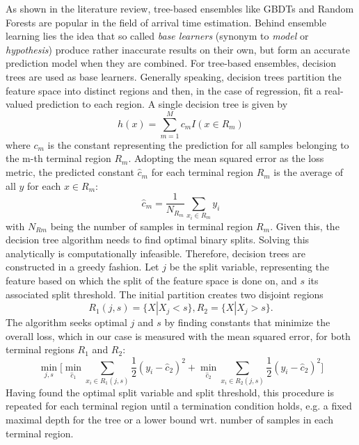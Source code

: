 As shown in the literature review, tree-based ensembles like GBDTs and Random Forests are popular in the field of arrival time estimation. Behind ensemble learning lies the idea that so called \textit{base learners} (synonym to \textit{model} or \textit{hypothesis}) produce rather inaccurate results on their own, but form an accurate prediction model when they are combined. For tree-based ensembles, decision trees are used as base learners. 
Generally speaking, decision trees partition the feature space into distinct regions and then, in the case of regression, fit a real-valued prediction to each region. 
A single decision tree is given by
\begin{equation}
h(x) = \sum_{m=1}^{M} c_m I(x \in R_m)
\end{equation}
where $ c_m $ is the constant representing the prediction for all samples belonging to the m-th terminal region $ R_m $. Adopting the mean squared error as the loss metric, the predicted constant $ \hat{c}_m $ for each terminal region $ R_m $ is the average of all $ y $ for each $ x \in R_m $:
\begin{equation}
	\hat{c}_m =  \dfrac{1}{N_{R_m}}\sum_{x_i \in R_m}^{} y_i
\end{equation}
with $ N_{Rm} $ being the number of samples in terminal region $ R_m $. Given this, the decision tree algorithm needs to find optimal binary splits. Solving this analytically is computationally infeasible. Therefore, decision trees are constructed in a greedy fashion.
Let $ j $ be the split variable, representing the feature based on which the split of the feature space is done on, and $ s $ its associated split threshold.
The initial partition creates two disjoint regions
\begin{equation}
	R_1 (j,s) = \{X | X_j < s \}, R_{2} = \{X | X_j > s\}.
\end{equation}
The algorithm seeks optimal $ j $ and $ s $ by finding constants that minimize the overall loss, which in our case is measured with the mean squared error, for both terminal regions $ R_1 $ and $ R_2 $:
\begin{equation}\label{minjs}
	\min_{j,s} \bigg [\min_{\hat{c}_1} \sum_{x_i \in R_1(j,s)} \dfrac{1}{2}(y_i - \hat{c}_{2})^2 + \min_{\hat{c}_2} \sum_{x_i \in R_{2}(j,s)} \dfrac{1}{2}(y_i - \hat{c}_{2})^2\bigg]
\end{equation}
Having found the optimal split variable and split threshold, this procedure is repeated for each terminal region until a termination condition holds, e.g. a fixed maximal depth for the tree or a lower bound wrt. number of samples in each terminal region.

